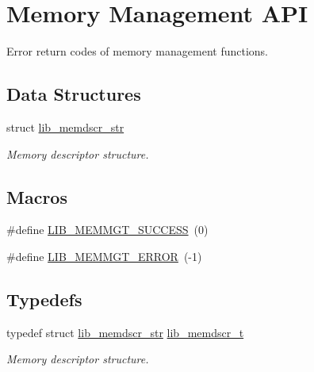 \hypertarget{group__libarch__memmgt}{}\section{Memory Management A\+P\+I}
\label{group__libarch__memmgt}


Error return codes of memory management functions.  


\subsection*{Data Structures}
\begin{DoxyCompactItemize}
\item 
struct \hyperlink{structlib__memdscr__str}{lib\+\_\+memdscr\+\_\+str}
\begin{DoxyCompactList}\small\item\em Memory descriptor structure. \end{DoxyCompactList}\end{DoxyCompactItemize}
\subsection*{Macros}
\begin{DoxyCompactItemize}
\item 
\#define \hyperlink{group__libarch__memmgt_gacfa30c2c1e697da904265b91b9c60d2f}{L\+I\+B\+\_\+\+M\+E\+M\+M\+G\+T\+\_\+\+S\+U\+C\+C\+E\+S\+S}~(0)
\item 
\#define \hyperlink{group__libarch__memmgt_ga21728661e7141fcfd212ca8286a7947b}{L\+I\+B\+\_\+\+M\+E\+M\+M\+G\+T\+\_\+\+E\+R\+R\+O\+R}~(-\/1)
\end{DoxyCompactItemize}
\subsection*{Typedefs}
\begin{DoxyCompactItemize}
\item 
typedef struct \hyperlink{structlib__memdscr__str}{lib\+\_\+memdscr\+\_\+str} \hyperlink{group__libarch__memmgt_ga933f44304562f9591104d57b7868ebc3}{lib\+\_\+memdscr\+\_\+t}
\begin{DoxyCompactList}\small\item\em Memory descriptor structure. \end{DoxyCompactList}\end{DoxyCompactItemize}
